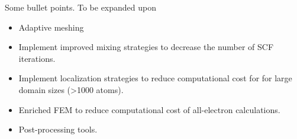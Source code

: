 Some bullet points. To be expanded upon
\begin{itemize}
\item Adaptive meshing
\item Implement improved mixing strategies to decrease the number of SCF iterations.
\item Implement localization strategies to reduce computational cost for for large domain sizes (>1000 atoms).
\item Enriched FEM to reduce computational cost of all-electron calculations.
\item Post-processing tools.
\end{itemize} 
